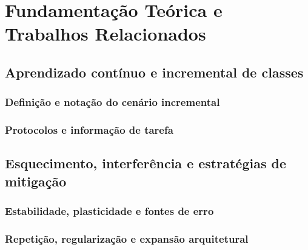 \chapter{Fundamentação Teórica e Trabalhos Relacionados}
\label{ch:fundamentacao}


\section{Aprendizado contínuo e incremental de classes}

\subsection{Definição e notação do cenário incremental}

\subsection{Protocolos e informação de tarefa}

\section{Esquecimento, interferência e estratégias de mitigação}

\subsection{Estabilidade, plasticidade e fontes de erro}

\subsection{Repetição, regularização e expansão arquitetural}

